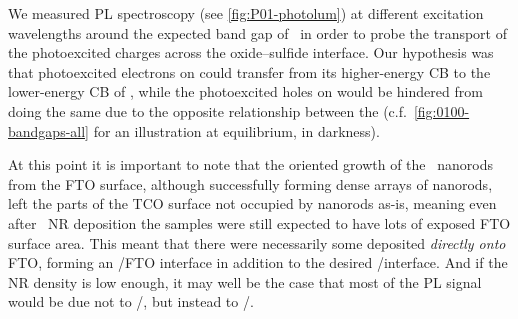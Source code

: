 \documentclass[webedition,openright,titles,swedish,english]{LuaUUThesis}\usepackage[]{graphicx}\usepackage[]{xcolor}
\newcommand{\cf}{c.f.}
\begin{document}
We measured \Gls{PL} spectroscopy (see \cref{fig:P01-photolum}) at different
excitation wavelengths around the expected band gap of \ZnO\ in order to
probe the transport of the photoexcited charges across the oxide--sulfide
interface.
Our hypothesis was that photoexcited electrons on  could transfer from
its higher-energy \gls{CB} to the lower-energy \gls{CB} of \ZnO, while the
photoexcited holes on  would be hindered from doing the same due to
the opposite relationship between the 
(\cf\ \cref{fig:0100-bandgaps-all} for an illustration at equilibrium, in darkness).

At this point it is important to note that the oriented growth of the
\ZnO\ nanorods from the \gls{FTO} surface, although successfully forming
dense arrays of nanorods, left the parts of the \gls{TCO} surface not occupied
by nanorods as-is, meaning even after \ZnO\ \gls{NR} deposition the samples
were still expected to have lots of exposed \gls{FTO} surface area.
This meant that there were necessarily some  deposited \emph{directly onto} \gls{FTO},
forming an /\gls{FTO} interface in addition to the desired /\ZnO interface.
And if the  \gls{NR} density is low enough, it may well
be the case that most of the \gls{PL} signal would be due not to /,
but instead to /.


%
\end{document}
